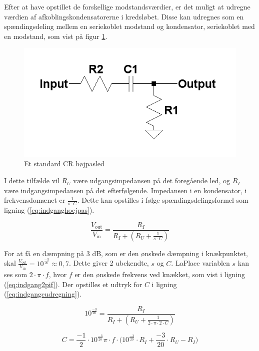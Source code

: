 Efter at have opstillet de forskellige modstandsværdier, er det muligt at udregne værdien af afkoblingskondensatorerne i kredsløbet. Disse kan udregnes som en spændingsdeling mellem en seriekoblet modstand og kondensator, seriekoblet med en modstand, som vist på figur \ref{crvd}.
\begin{figure}[h]
\centering
\includegraphics[scale=0.4]{teknisk/indgangsvaelger/hoejpasfilter.png}
\caption{Et standard CR højpasled}
\label{crvd}
\end{figure}
 I dette tilfælde vil $R_U$ være udgangsimpedansen på det foregående led, og $R_I$ være indgangsimpedansen på det efterfølgende. Impedansen i en kondensator, i frekvensdomænet er $\frac{1}{s\cdot C}$. Dette kan opstilles i følge spændingsdelingsformel som ligning (\ref{eq:indganghoejpas}).

\begin{equation}
\label{eq:indganghoejpas}
\frac{V_{\mathrm{out}}}{V_{\mathrm{in}}}=\frac{R_I}{R_I+(R_U+\frac{1}{s\cdot C})}
\end{equation}

For at få en dæmpning på 3 dB, som er den ønskede dæmpning i knækpunktet, skal $\frac{V_{\mathrm{out}}}{V_{\mathrm{in}}}=10^{\frac{-3}{20}}\approx0,7$. 
Dette giver 2 ubekendte, $s$ og $C$. LaPlace variablen $s$ kan ses som $2\cdot \pi \cdot f$, hvor $f$ er den ønskede frekvens ved knækket, som vist i ligning (\ref{eq:indgang2pif}). Der opstilles et udtryk for $C$ i ligning (\ref{eq:indgangcudregning}).

\begin{equation}
\label{eq:indgang2pif}
10^{\frac{-3}{20}}=\frac{R_I}{R_I+(R_U+\frac{1}{2\cdot\pi\cdot 2\cdot C})}
\end{equation}

\begin{equation}
\label{eq:indgangcudregning}
C=\frac{-1}{2}\cdot{10^{\frac{-3}{20}}}{\pi\cdot f\cdot(10^{\frac{-3}{20}}\cdot R_I+\frac{-3}{20}}\cdot R_U - R_I)
\end{equation}

